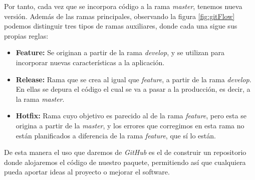 Por tanto, cada vez que se incorpora código a la rama \textit{master}, tenemos nueva versión. Además de las ramas principales, observando la figura \ref{fig:gitFlow} podemos distinguir tres tipos de ramas auxiliares, donde cada una sigue sus propias reglas:
\begin{itemize}
    \item \textbf{Feature:} Se originan a partir de la rama \textit{develop}, y  se utilizan para incorporar nuevas características a la aplicación.
    \item \textbf{Release:} Rama que se crea al igual que \textit{feature}, a partir de la rama \textit{develop}. En ellas se depura el código el cual se va a pasar a la producción, es decir, a la rama \textit{master}.
    \item \textbf{Hotfix:} Rama cuyo objetivo es parecido al de la rama \textit{feature}, pero esta se origina a partir de la \emph{master}, y los errores que corregimos en esta rama no están planificados a diferencia de la rama \emph{feature}, que sí lo están.
\end{itemize}
De esta manera el uso que daremos de \emph{GitHub} es el de construir un repositorio donde alojaremos el código de nuestro paquete, permitiendo así que cualquiera pueda aportar ideas al proyecto o mejorar el software.

